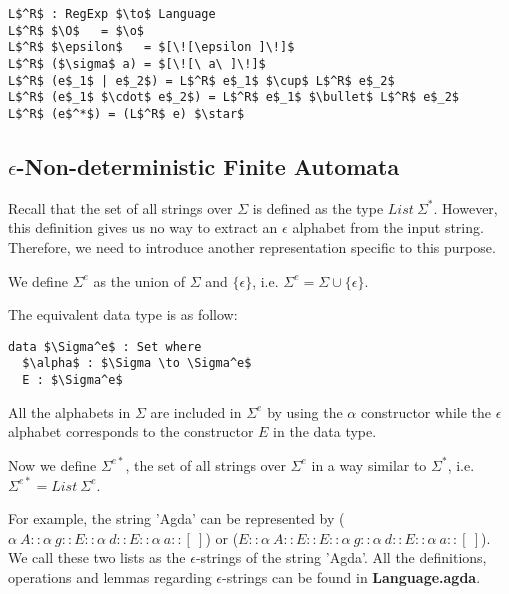 \begin{lstlisting}[mathescape=true,xleftmargin=.3\textwidth]
L$^R$ : RegExp $\to$ Language
L$^R$ $\O$   = $\o$
L$^R$ $\epsilon$   = $[\![\epsilon ]\!]$
L$^R$ ($\sigma$ a) = $[\![\ a\ ]\!]$
L$^R$ (e$_1$ | e$_2$) = L$^R$ e$_1$ $\cup$ L$^R$ e$_2$
L$^R$ (e$_1$ $\cdot$ e$_2$) = L$^R$ e$_1$ $\bullet$ L$^R$ e$_2$
L$^R$ (e$^*$) = (L$^R$ e) $\star$
\end{lstlisting} 


\subsection{\(\epsilon\)-Non-deterministic Finite Automata}
\par Recall that the set of all strings over \(\Sigma\) is defined as
the type \(List\ \Sigma^*\). However, this definition gives us no way to
extract an \(\epsilon\) alphabet from the input string. Therefore,
we need to introduce another representation specific to this purpose. 

\begin{defn}
\noindent We define \(\Sigma^e\) as the union of
\(\Sigma\) and \(\{\epsilon\}\), i.e. \(\Sigma^e = \Sigma \cup \{\epsilon\}\).
\end{defn} 

\par The equivalent data type is as follow:
\begin{lstlisting}[mathescape=true,xleftmargin=.3\textwidth]
data $\Sigma^e$ : Set where
  $\alpha$ : $\Sigma \to \Sigma^e$
  E : $\Sigma^e$
\end{lstlisting}

\par All the alphabets in \(\Sigma\) are included in \(\Sigma^e\) by using the
\(\alpha\) constructor while the \(\epsilon\) alphabet corresponds to
the constructor \(E\) in the data type. 

\begin{defn}
\noindent Now we define \(\Sigma^{e*}\), the set of all strings over
\(\Sigma^e\) in a way similar to \(\Sigma^*\), i.e. \(\Sigma^{e*} =
List\ \Sigma^e\). 
\end{defn}

\par For example, the string 'Agda' can be
represented by (\(\alpha\ A :: \alpha\ g :: E :: \alpha\ d :: E :: \alpha\
a :: [\ ]\)) or (\(E :: \alpha\ A :: E :: E :: \alpha\ g :: \alpha\ d ::
E :: \alpha\ a :: [\ ]\)). We call these two lists as the \(\epsilon\)-strings of the
string 'Agda'. All the definitions, operations and lemmas regarding
\(\epsilon\)-strings can be found in \textbf{Language.agda}. 

